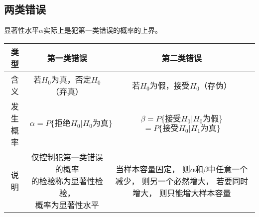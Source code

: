 \subsection{两类错误}

显著性水平$\alpha$实际上是犯第一类错误的概率的上界。\medskip

\begin{center}{
    \begin{tabular}{|c|c|c|}
        \hline
        类型 & 第一类错误 & 第二类错误 \\ \hline
        含义 & 若$H_0$为真，否定$H_0$（弃真）& 若$H_0$为假，接受$H_0$（存伪）\\ \hline
        发生概率 & $\alpha=P\{\text{拒绝}H_0|H_0\text{为真}\}$ & \tabincell{c}{$\beta=P\{\text{接受}H_0|H_0\text{为假}\}$\\$=P\{\text{接受}H_0|H_1\text{为真}\}$} \\ \hline
        说明 & \tabincell{c}{仅控制犯第一类错误的概率\\的检验称为显著性检验，\\概率为显著性水平} & \tabincell{c}{当样本容量固定，\\则$\alpha$和$\beta$中任意一个减少，\\则另一个必然增大，\\若要同时增大，\\则只能增大样本容量} \\ \hline
    \end{tabular}
}\end{center} \medskip

%
